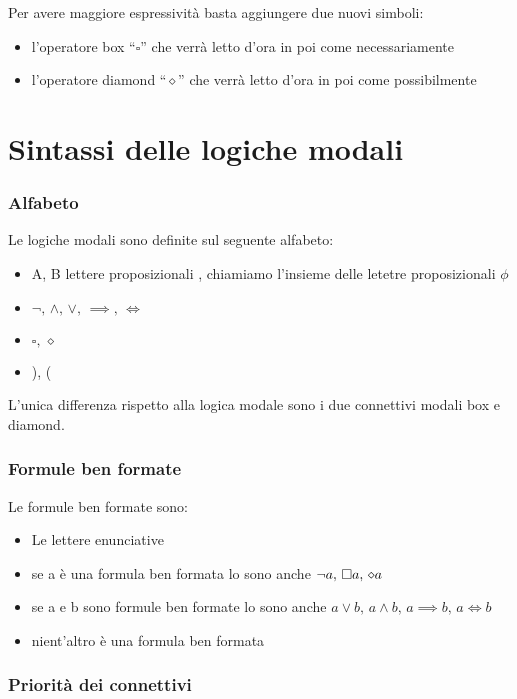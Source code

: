 Per avere maggiore espressività basta aggiungere due nuovi simboli:
\begin{itemize}
\item l'operatore box ``$\square$'' che verrà letto d'ora in poi come
necessariamente
\item l'operatore diamond ``$\diamond$'' che verrà letto d'ora in poi
come possibilmente
\end{itemize}

\section{Sintassi delle logiche modali}


\subsubsection*{Alfabeto}

Le logiche modali sono definite sul seguente alfabeto:
\begin{itemize}
\item A, B lettere proposizionali , chiamiamo l'insieme delle letetre proposizionali
$\phi$
\item $\neg,\,\wedge,\,\vee,\,\implies,\,\iff$
\item $\square,\,\diamond$
\item ), (
\end{itemize}
L'unica differenza rispetto alla logica modale sono i due connettivi
modali box e diamond.


\subsubsection*{Formule ben formate}

Le formule ben formate sono:
\begin{itemize}
\item Le lettere enunciative 
\item se a è una formula ben formata lo sono anche $\neg a,\,\square a,\,\diamond a$
\item se a e b sono formule ben formate lo sono anche $a\vee b,\, a\wedge b,\, a\implies b,\, a\iff b$
\item nient'altro è una formula ben formata
\end{itemize}

\subsubsection*{Priorità dei connettivi}

